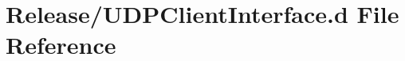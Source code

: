 \hypertarget{Release_2UDPClientInterface_8d}{}\section{Release/\+U\+D\+P\+Client\+Interface.d File Reference}
\label{Release_2UDPClientInterface_8d}
